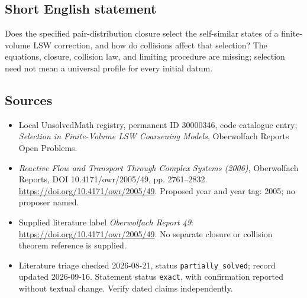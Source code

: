 \documentclass[11pt]{article}
\begin{document}
\subsection{Short English statement}
Does the specified pair-distribution closure select the self-similar states of a finite-volume LSW correction, and how do collisions affect that selection? The equations, closure, collision law, and limiting procedure are missing; selection need not mean a universal profile for every initial datum.
\subsection{Sources}
\begin{itemize}\item Local UnsolvedMath registry, permanent ID 30000346, code catalogue entry; \emph{Selection in Finite-Volume LSW Coarsening Models}, Oberwolfach Reports Open Problems.\item \emph{Reactive Flow and Transport Through Complex Systems (2006)}, Oberwolfach Reports, DOI 10.4171/owr/2005/49, pp. 2761--2832. \url{https://doi.org/10.4171/owr/2005/49}. Proposed year and year tag: 2005; no proposer named.\item Supplied literature label \emph{Oberwolfach Report 49}: \url{https://doi.org/10.4171/owr/2005/49}. No separate closure or collision theorem reference is supplied.\item Literature triage checked 2026-08-21, status \texttt{partially\_solved}; record updated 2026-09-16. Statement status \texttt{exact}, with confirmation reported without textual change. Verify dated claims independently.\end{itemize}
\end{document}
